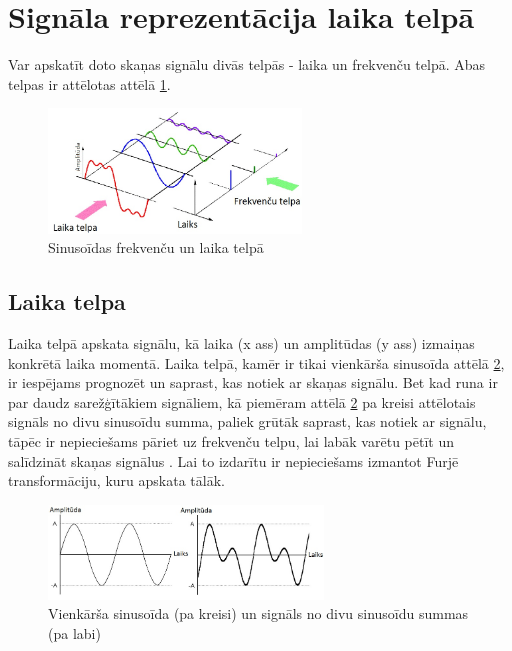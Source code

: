 \documentclass[12pt,paper=A4]{report}
\begin{document}
\FloatBarrier
\section{Signāla reprezentācija laika telpā}
Var apskatīt doto skaņas signālu divās telpās - laika un frekvenču telpā. Abas telpas ir attēlotas attēlā \ref{domains}. 

\begin{figure}[H] \centering
\includegraphics[width=0.60\textwidth]{up-sampling-fig3-lg} 
\caption{Sinusoīdas frekvenču un laika telpā \cite{domains}}  \label{domains} 
\end{figure}

\subsection{Laika telpa}

Laika telpā apskata signālu, kā laika (x ass) un amplitūdas (y ass) izmaiņas konkrētā laika momentā. Laika telpā, kamēr ir tikai vienkārša sinusoīda attēlā \ref{two-sinusoids},  ir iespējams prognozēt un saprast, kas notiek ar skaņas signālu. Bet kad runa ir par daudz sarežģītākiem signāliem, kā piemēram attēlā \ref{two-sinusoids} pa kreisi attēlotais signāls no divu sinusoīdu summa, paliek grūtāk saprast, kas notiek ar signālu, tāpēc ir nepieciešams pāriet uz frekvenču telpu, lai labāk varētu pētīt un salīdzināt skaņas signālus \cite{http://www.erzetich-audio.com/knowledgebase-05-time-vs-frequency}. Lai to izdarītu ir nepieciešams izmantot Furjē transformāciju, kuru apskata tālāk. 
\begin{figure}[H] \centering
\includegraphics[width=0.65\textwidth]{soundsignals} 
\caption{Vienkārša sinusoīda (pa kreisi) un signāls no divu sinusoīdu summas (pa labi) \cite{http://www.erzetich-audio.com/knowledgebase-05-time-vs-frequency}}  \label{two-sinusoids} 
\end{figure}
\end{document}
